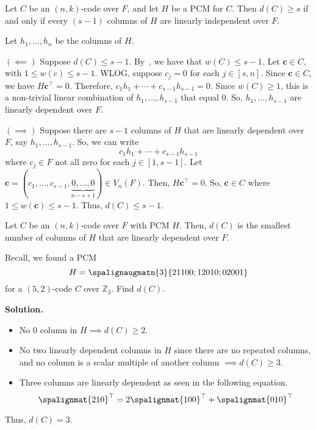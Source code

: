 
\begin{Theorem}{}{}
    Let $ C $ be an $ (n,k) $-code over $ F $, and let $ H $ be a PCM
    for $ C $. Then $ d(C)\geqslant s $ if and only if every $ (s-1) $ columns
    of $ H $ are linearly independent over $ F $.
\end{Theorem}

\begin{Proof}{}{}
    Let $ h_1,\ldots ,h_n $ be the columns of $ H $.

    $ (\impliedby) $ Suppose $ d(C)\leqslant s-1 $. By~,
    we have that $ w(C)\leqslant s-1 $.
    Let $ \symbf{c}\in C $, with $ 1\leqslant w(c)\leqslant s-1 $. WLOG, suppose
    $ c_j=0 $ for each $ j\in[s,n] $. Since $ \symbf{c}\in C $,
    we have $ H\symbf{c}^{\top}=0 $. Therefore,
    $ c_1h_1+\cdots+c_{s-1}h_{s-1}=0 $.
    Since $ w(C)\geqslant 1 $, this is a non-trivial linear combination
    of $ h_1,\ldots ,h_{s-1} $ that equal $ 0 $. So,
    $ h_1,\ldots ,h_{s-1} $ are linearly dependent over $ F $.

    $ (\implies) $ Suppose there are $ s-1 $ columns of $ H $ that
    are linearly dependent over $ F $, say $ h_1,\ldots ,h_{s-1} $. So,
    we can write
    \[ c_1h_1+\cdots+c_{s-1}h_{s-1} \]
    where $ c_j\in F $ not all zero for each $ j\in[1,s-1] $.
    Let $ \symbf{c}=(c_1,\ldots ,c_{s-1},
        \underbrace{0,\ldots,0}_{n-s+1})\in V_n(F) $. Then,
    $ H\symbf{c}^{\top}=0 $. So, $ \symbf{c}\in C $ where $ 1\leqslant w(\symbf{c})\leqslant s-1 $.
    Thus, $ d(C)\leqslant s-1 $.
\end{Proof}

\begin{Corollary}{}{}
    Let $ C $ be an $ (n,k) $-code over $ F $ with PCM $ H $. Then,
    $ d(C) $ is the smallest number of columns of $ H $ that
    are linearly dependent over $ F $.
\end{Corollary}

\begin{Example}{}{}
    Recall, we found a PCM
    \[ H=\spalignaugmatn{3}{
            2 1 1 0 0;
            1 2 0 1 0;
            0 2 0 0 1} \]
    for a $ (5,2) $-code $ C $ over $ \mathbb{Z}_3 $. Find $ d(C) $.

    \textbf{Solution.}
    \begin{itemize}
        \item No $ 0 $ column in $ H\implies d(C)\geqslant 2 $.
        \item No two linearly dependent columns in $ H $ since there are
              no repeated columns, and no column is a scalar multiple of another
              column $ \implies d(C)\geqslant 3 $.
        \item Three columns are linearly dependent as seen in the following equation.
              \[ \spalignmat{2 1 0}^\top=2\spalignmat{1 0 0}^\top+\spalignmat{0 1 0}^\top \]
    \end{itemize}
    Thus, $ d(C)=3 $.
\end{Example}

